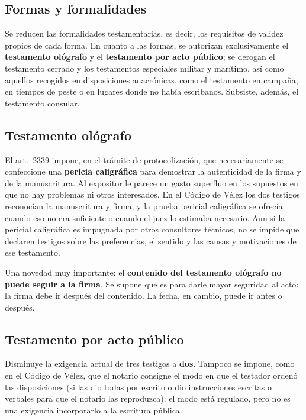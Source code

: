 \documentclass[12pt,oneside]{book}
\begin{document}
\subsection{Formas y formalidades}

Se reducen las formalidades testamentarias, es decir, los requisitos de validez propios de cada forma. En cuanto a las formas, se autorizan exclusivamente el \textbf{testamento ológrafo} y el \textbf{testamento por acto público}; se derogan el testamento cerrado y los testamentos especiales militar y marítimo, así como aquellos recogidos en disposiciones anacrónicas, como el testamento en campaña, en tiempos de peste o en lugares donde no había escribanos. Subsiste, además, el testamento consular.

\subsection{Testamento ológrafo}

El art.~2339 impone, en el trámite de protocolización, que necesariamente se confeccione una \textbf{pericia caligráfica} para demostrar la autenticidad de la firma y de la manuscritura. Al expositor le parece un gasto superfluo en los supuestos en que no hay problemas ni otros interesados. En el Código de Vélez los dos testigos reconocían la manuscritura y firma, y la prueba pericial caligráfica se ofrecía cuando eso no era suficiente o cuando el juez lo estimaba necesario. Aun si la pericial caligráfica es impugnada por otros consultores técnicos, no se impide que declaren testigos sobre las preferencias, el sentido y las causas y motivaciones de ese testamento.

Una novedad muy importante: el \textbf{contenido del testamento ológrafo no puede seguir a la firma}. Se supone que es para darle mayor seguridad al acto: la firma debe ir después del contenido. La fecha, en cambio, puede ir antes o después.

\subsection{Testamento por acto público}

Disminuye la exigencia actual de tres testigos a \textbf{dos}. Tampoco se impone, como en el Código de Vélez, que el notario consigne el modo en que el testador ordenó las disposiciones (si las dio todas por escrito o dio instrucciones escritas o verbales para que el notario las reproduzca): el modo está regulado, pero no es una exigencia incorporarlo a la escritura pública.
\end{document}
